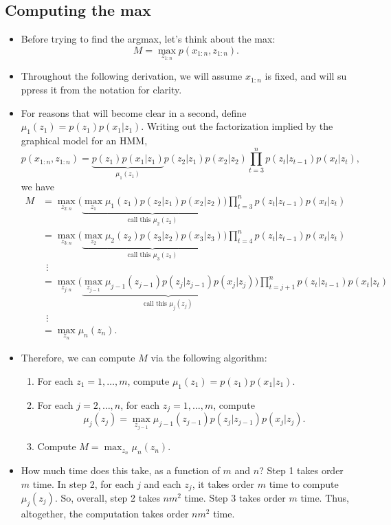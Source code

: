 \documentclass[12pt]{article}
\begin{document}
\subsection{Computing the max}
\begin{itemize}
\item Before trying to find the argmax, let's think about the max:
$$ M = \max_{z_{1:n}} p(x_{1:n},z_{1:n}). $$
\item Throughout the following derivation, we will assume $x_{1:n}$ is fixed, and will su
ppress it from the notation for clarity. 
\item For reasons that will become clear in a second, define $\mu_1(z_1) = p(z_1) p(x_1 | z_1)$. Writing out the factorization implied by the graphical model for an HMM,
$$ p(x_{1:n},z_{1:n}) = \underbrace{p(z_1) p(x_1 | z_1)}_{\textstyle\mu_1(z_1)} p(z_2 | z_1) p(x_2 | z_2)
	 \prod_{t = 3}^n p(z_ t | z_{t -1}) p(x_t | z_t), $$
we have
\begin{align*}
M &= \max_{z_{2:n}} \Big(\underbrace{\max_{z_1} \mu_1(z_1) p(z_2 | z_1) p(x_2 | z_2)}_{\textstyle\text{call this } \mu_2(z_2)}\Big)
	 \prod_{t = 3}^n p(z_ t | z_{t -1}) p(x_t | z_t) \\
  &= \max_{z_{3:n}} \Big(\underbrace{\max_{z_2} \mu_2(z_2) p(z_3 | z_2) p(x_3 | z_3)}_{\textstyle\text{call this } \mu_3(z_3)}\Big)
  	 \prod_{t = 4}^n p(z_ t | z_{t -1}) p(x_t | z_t) \\
  &~~\vdots\\
  &= \max_{z_{j:n}} \Big(\underbrace{\max_{z_{j-1}} \mu_{j-1}(z_{j-1}) p(z_j | z_{j-1}) p(x_j | z_j)}_{\textstyle\text{call this } \mu_j(z_j)}\Big)
  	 \prod_{t = j+1}^n p(z_ t | z_{t -1}) p(x_t | z_t) \\
  &~~\vdots\\
  &= \max_{z_n} \mu_n(z_n).
\end{align*}
\item Therefore, we can compute $M$ via the following algorithm:
\begin{enumerate}
\item For each $z_1 = 1,\ldots,m$, compute $\mu_1(z_1) = p(z_1) p(x_1 | z_1)$.
\item For each $j = 2,\ldots,n$, for each $z_j = 1,\ldots,m$, compute
$$ \mu_j(z_j) = \max_{z_{j-1}} \mu_{j -1}(z_{j -1}) p(z_j | z_{j-1}) p(x_j | z_j). $$
\item Compute $M = \max_{z_n} \mu_n (z_n)$.
\end{enumerate}
\item How much time does this take, as a function of $m$ and $n$? Step 1 takes order $m$ time. In step 2, for each $j$ and each $z_j$, it takes order $m$ time to compute $\mu_j(z_j)$. So, overall, step 2 takes $n m^2$ time. Step 3 takes order $m$ time. Thus, altogether, the computation takes order $n m^2$ time.
\end{itemize}
\end{document}
